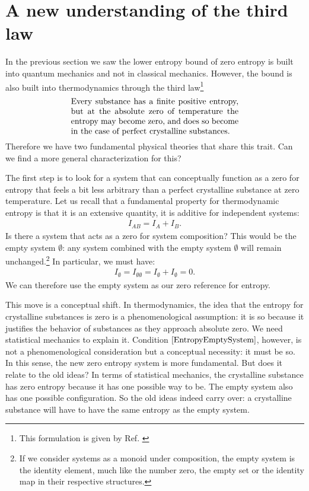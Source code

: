 \documentclass[10pt,twocolumn, nofootinbib]{revtex4-2}
\begin{document}
\section{A new understanding of the third law}

In the previous section we saw the lower entropy bound of zero entropy is built into quantum mechanics and not in classical mechanics. However, the bound is also built into thermodynamics through the third law\footnote{This formulation is given by Ref. \cite{lewis1923thermodynamics}}
\begin{align}\label{ThirdLaw}
	\parbox{2.8in}{Every substance has a finite positive entropy, but
		at the absolute zero of temperature the entropy may become zero, and does so
		become in the case of perfect crystalline substances.}
\end{align}
Therefore we have two fundamental physical theories that share this trait. Can we find a more general characterization for this?

The first step is to look for a system that can conceptually function as a zero for entropy that feels a bit less arbitrary than a perfect crystalline substance at zero temperature. Let us recall that a fundamental property for thermodynamic entropy is that it is an extensive quantity, it is additive for independent systems:
\begin{align}
	I_{AB} = I_{A} + I_{B}.
\end{align}
Is there a system that acts as a zero for system composition? This would be the empty system $\emptyset$: any system combined with the empty system $\emptyset$ will remain unchanged.\footnote{If we consider systems as a monoid under composition, the empty system is the identity element, much like the number zero, the empty set or the identity map in their respective structures.} In particular, we must have:
\begin{align}\label{EntropyEmptySystem}
	I_{\emptyset} = I_{\emptyset\emptyset} = I_{\emptyset} + I_{\emptyset} = 0.
\end{align}
We can therefore use the empty system as our zero reference for entropy.

This move is a conceptual shift. In thermodynamics, the idea that the entropy for crystalline substances is zero is a phenomenological assumption: it is so because it justifies the behavior of substances as they approach absolute zero. We need statistical mechanics to explain it. Condition $\eqref{EntropyEmptySystem}$, however, is not a phenomenological consideration but a conceptual necessity: it must be so. In this sense, the new zero entropy system is more fundamental. But does it relate to the old ideas? In terms of statistical mechanics, the crystalline substance has zero entropy because it has one possible way to be. The empty system also has one possible configuration. So the old ideas indeed carry over: a crystalline substance will have to have the same entropy as the empty system.
\end{document}
